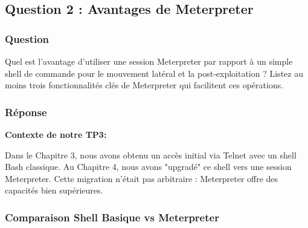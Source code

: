 \documentclass[12pt,a4paper,openany]{report}
\begin{document}
	\subsection{Question 2 : Avantages de Meterpreter}
	
	\subsubsection{Question}
	
	Quel est l'avantage d'utiliser une session Meterpreter par rapport à un 
	simple shell de commande pour le mouvement latéral et la post-exploitation ? 
	Listez au moins trois fonctionnalités clés de Meterpreter qui facilitent 
	ces opérations.
	
	\subsubsection{Réponse}
	
	\textbf{Contexte de notre TP3:}
	
	Dans le Chapitre 3, nous avons obtenu un accès initial via Telnet avec 
	un shell Bash classique. Au Chapitre 4, nous avons "upgradé" ce shell 
	vers une session Meterpreter. Cette migration n'était pas arbitraire : 
	Meterpreter offre des capacités bien supérieures.
	
	\subsubsection{Comparaison Shell Basique vs Meterpreter}
	
\end{document}
